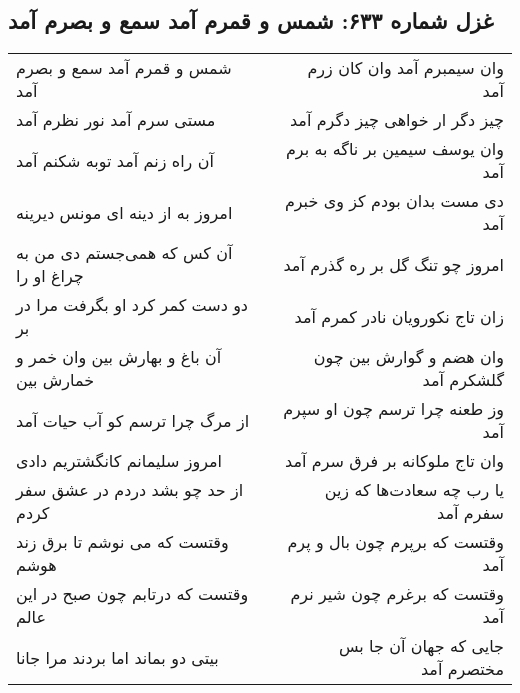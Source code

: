 \begin{center}
\section*{غزل شماره ۶۳۳: شمس و قمرم آمد سمع و بصرم آمد}
\label{sec:0633}
\begin{longtable}{l p{0.5cm} r}
شمس و قمرم آمد سمع و بصرم آمد
&&
وان سیمبرم آمد وان کان زرم آمد
\\
مستی سرم آمد نور نظرم آمد
&&
چیز دگر ار خواهی چیز دگرم آمد
\\
آن راه زنم آمد توبه شکنم آمد
&&
وان یوسف سیمین بر ناگه به برم آمد
\\
امروز به از دینه ای مونس دیرینه
&&
دی مست بدان بودم کز وی خبرم آمد
\\
آن کس که همی‌جستم دی من به چراغ او را
&&
امروز چو تنگ گل بر ره گذرم آمد
\\
دو دست کمر کرد او بگرفت مرا در بر
&&
زان تاج نکورویان نادر کمرم آمد
\\
آن باغ و بهارش بین وان خمر و خمارش بین
&&
وان هضم و گوارش بین چون گلشکرم آمد
\\
از مرگ چرا ترسم کو آب حیات آمد
&&
وز طعنه چرا ترسم چون او سپرم آمد
\\
امروز سلیمانم کانگشتریم دادی
&&
وان تاج ملوکانه بر فرق سرم آمد
\\
از حد چو بشد دردم در عشق سفر کردم
&&
یا رب چه سعادت‌ها که زین سفرم آمد
\\
وقتست که می نوشم تا برق زند هوشم
&&
وقتست که برپرم چون بال و پرم آمد
\\
وقتست که درتابم چون صبح در این عالم
&&
وقتست که برغرم چون شیر نرم آمد
\\
بیتی دو بماند اما بردند مرا جانا
&&
جایی که جهان آن جا بس مختصرم آمد
\\
\end{longtable}
\end{center}
